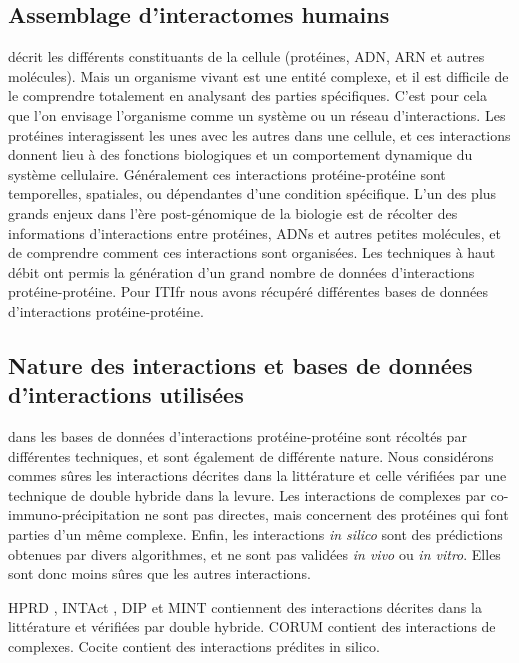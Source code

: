 		\subsection{\textcolor{green!45!black}{Assemblage d'interactomes humains}}
			 décrit les différents constituants de la cellule (protéines, \acs{ADN}, \acs{ARN} et autres molécules). Mais un organisme vivant est une entité complexe, et il est difficile de le comprendre totalement en analysant des parties spécifiques. C'est pour cela que l'on envisage l'organisme comme un système ou un réseau d'interactions.
			Les protéines interagissent les unes avec les autres dans une cellule, et ces interactions donnent lieu à des fonctions biologiques et un comportement dynamique du système cellulaire. Généralement ces interactions protéine-protéine sont temporelles, spatiales, ou dépendantes d'une condition spécifique.
			L'un des plus grands enjeux dans l'ère post-génomique de la biologie est de récolter des informations d'interactions entre protéines, \acsp{ADN} et autres petites molécules, et de comprendre comment ces interactions sont organisées.
			Les techniques à haut débit ont permis la génération d'un grand nombre de données d'interactions protéine-protéine.
			Pour \acs{ITIfr} nous avons récupéré différentes bases de données d'interactions protéine-protéine.

		\subsection{\textcolor{green!45!black}{Nature des interactions et bases de données d'interactions utilisées}}
			 dans les bases de données d'interactions protéine-protéine sont récoltés par différentes techniques, et sont également de différente nature.
			Nous considérons commes sûres les interactions décrites dans la littérature et celle vérifiées par une technique de double hybride dans la levure.
			Les interactions de complexes par co-immuno-précipitation ne sont pas directes, mais concernent des protéines qui font parties d'un même complexe.
			Enfin, les interactions \emph{in silico} sont des prédictions obtenues par divers algorithmes, et ne sont pas validées \emph{in vivo} ou \emph{in vitro}.
			Elles sont donc moins sûres que les autres interactions. 

			\ac{HPRD} \citep{Prasad2009}, INTAct \citep{Kerrien2012}, \ac{DIP} \citep{Xenarios2000} et \ac{MINT} \citep{Zanzoni2002} contiennent des interactions décrites dans la littérature et vérifiées par double hybride.
			\ac{CORUM} \citep{Ruepp2008} contient des interactions de complexes.
			Cocite \citep{Ramani2005} contient des interactions prédites in silico.


